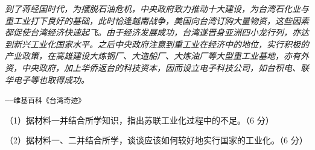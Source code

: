 \documentclass{ctexart}
\begin{document}
\textit{到了蒋经国时代，为摆脱石油危机，中央政府致力推动十大建设，为台湾石化业与重工业打下良好的基础，此时恰逢越南战争，美国向台湾订购大量物资，这些因素都促使台湾经济快速起飞。由于经济发展成功，台湾遂晋身亚洲四小龙行列，亦达到新兴工业化国家水平。之后中央政府注意到重工业在经济中的地位，实行积极的产业政策，在高雄建设大炼钢厂、大造船厂、大炼油厂等大型重工业基地，亦有外资，中央政府，加上华侨返台的科技资本，因而设立电子科技公司，如台积电、联华电子等也取得成功。}

\begin{flushright}

\texttt{——维基百科《台湾奇迹》}

\end{flushright}

（1）据材料一并结合所学知识，指出苏联工业化过程中的不足。（6 分）

（2）据材料一、二并结合所学，谈谈应该如何较好地实行国家的工业化。（6 分）
\end{document}
